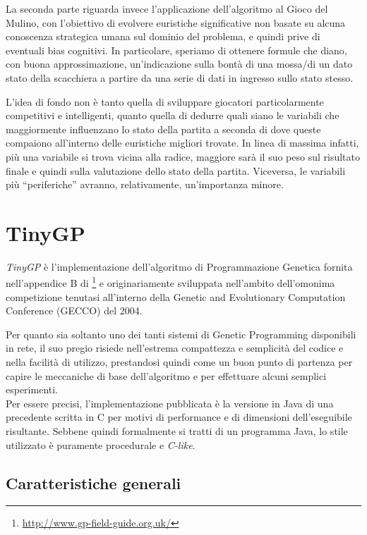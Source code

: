 \documentclass{../llncs}
\newcommand{\java}{\textsf{Java}\xspace}
\newcommand{\labelsec}[1]{\label{sec:#1}}
\newcommand{\labelssec}[1]{\label{ssec:#1}}
\begin{document}
La seconda parte riguarda invece l'applicazione dell'algoritmo al Gioco del Mulino, con l'obiettivo di evolvere euristiche significative non basate su alcuna conoscenza strategica umana sul dominio del problema, e quindi prive di eventuali bias cognitivi. In particolare, speriamo di ottenere formule che diano, con buona approssimazione, un'indicazione sulla bontà di una mossa/di un dato stato della scacchiera a partire da una serie di dati in ingresso sullo stato stesso.

L'idea di fondo non è tanto quella di sviluppare giocatori particolarmente competitivi e intelligenti, quanto quella di dedurre quali siano le variabili che maggiormente influenzano lo stato della partita a seconda di dove queste compaiono all'interno delle euristiche migliori trovate. In linea di massima infatti, più una variabile si trova vicina alla radice, maggiore sarà il suo peso sul risultato finale e quindi sulla valutazione dello stato della partita. Viceversa, le variabili più ``periferiche'' avranno, relativamente, un'importanza minore.

\section{TinyGP}
\labelsec{tinygp}

\emph{TinyGP} è l'implementazione dell'algoritmo di Programmazione Genetica fornita nell'appendice B di \footnote{\url{http://www.gp-field-guide.org.uk/}} e originariamente sviluppata nell'ambito dell'omonima competizione tenutasi all'interno della Genetic and Evolutionary Computation Conference (GECCO) del 2004.

Per quanto sia soltanto uno dei tanti sistemi di Genetic Programming disponibili in rete, il suo pregio risiede nell'estrema compattezza e semplicità del codice e nella facilità di utilizzo, prestandosi quindi come un buon punto di partenza per capire le meccaniche di base dell'algoritmo e per effettuare alcuni semplici esperimenti.\\

Per essere precisi, l'implementazione pubblicata è la versione in \java di una precedente scritta in C per motivi di performance e di dimensioni dell'eseguibile risultante. Sebbene quindi formalmente si tratti di un programma \java, lo stile utilizzato è puramente procedurale e \emph{C-like}.

\subsection{Caratteristiche generali}
\labelssec{TinyGP_mainFeatures}
\end{document}
